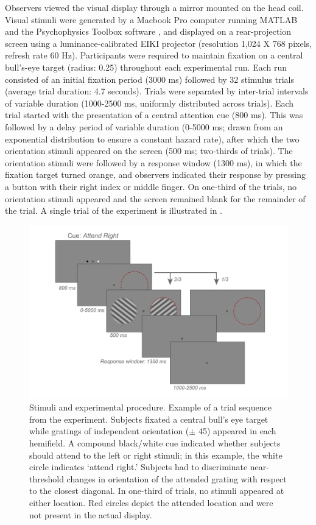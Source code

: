 \documentclass[9pt,lineno]{aperture}
\begin{document}
Observers viewed the visual display through a mirror mounted on the head coil. Visual stimuli were generated by a Macbook Pro computer running MATLAB and the Psychophysics Toolbox software \citep{Brainard1997,Pelli1997}, and displayed on a rear-projection screen using a luminance-calibrated EIKI projector (resolution 1,024 X 768 pixels, refresh rate 60 Hz).
Participants were required to maintain fixation on a central bull's-eye target (radius: 0.25\textdegree) throughout each experimental run. Each run consisted of an initial fixation period (3000 ms) followed by 32 stimulus trials (average trial duration: 4.7 seconds). Trials were separated by inter-trial intervals of variable duration (1000-2500 ms, uniformly distributed across trials). Each trial started with the presentation of a central attention cue (800 ms). This was followed by a delay period of variable duration (0-5000 ms; drawn from an exponential distribution to ensure a constant hazard rate), after which the two orientation stimuli appeared on the screen (500 ms; two-thirds of trials). The orientation stimuli were followed by a response window (1300 ms), in which the fixation target turned orange, and observers indicated their response by pressing a button with their right index or middle finger. On one-third of the trials, no orientation stimuli appeared and the screen remained blank for the remainder of the trial. A single trial of the experiment is illustrated in .

\begin{figure}
 \includegraphics[width=\linewidth]{img/experiment.png}
\caption{Stimuli and experimental procedure. Example of a trial sequence from the experiment. Subjects fixated a central bull's eye target while gratings of independent orientation ($\pm$ 45\textdegree) appeared in each hemifield. A compound black/white cue indicated whether subjects should attend to the left or right stimuli; in this example, the white circle indicates `attend right.' Subjects had to discriminate near-threshold changes in orientation of the attended grating with respect to the closest diagonal. In one-third of trials, no stimuli appeared at either location. Red circles depict the attended location and were not present in the actual display.}
\label{fig:experiment}
\end{figure}
\end{document}
